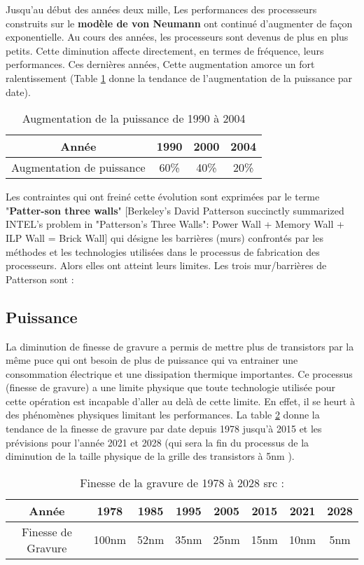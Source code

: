 Jusqu’au début des années deux mille, Les performances des processeurs construits sur le \textbf{modèle de von Neumann} ont continué d’augmenter de façon exponentielle. Au cours des années, les processeurs sont devenus de plus en plus petits. Cette diminution affecte directement, en termes de fréquence, leurs performances. Ces dernières années, Cette augmentation amorce un fort ralentissement (Table \ref{table:TB_2_1} donne la tendance de l'augmentation de la puissance par date).

\begin{table}[h!]
\centering
\begin{tabular}{| c |c | c | c|} 
\hline
Année & 1990 & 2000 & 2004 \\ [0.5ex] \hline
Augmentation de puissance & 60\% & 40\% & 20\% \\ [1ex] 
\hline
\end{tabular}
\caption{Augmentation de la puissance de 1990 à 2004 \cite{qaca17}}
\label{table:TB_2_1}
\end{table}

Les contraintes qui ont freiné cette évolution sont exprimées par le terme "\textbf{Patter-son three walls}" [Berkeley's David Patterson succinctly summarized INTEL's problem in "Patterson's Three Walls": Power Wall + Memory Wall + ILP Wall = Brick Wall]\cite{russ10} qui désigne les barrières (murs) confrontés par les méthodes et les technologies utilisées dans le processus de fabrication des processeurs. Alors elles ont atteint leurs limites. Les trois mur/barrières de Patterson sont :
%
\subsection{Puissance}
%
La diminution de finesse de gravure a permis de mettre plus de transistors par la même puce qui ont besoin de plus de puissance qui va entrainer une consommation électrique et une dissipation thermique importantes. %
Ce processus (finesse de gravure) a une limite physique que toute technologie utilisée pour cette opération est incapable d'aller au delà de cette limite. En effet, il se heurt à des phénomènes physiques limitant les performances. La table \ref{table:TB_2_2} donne la tendance de la finesse de gravure par date depuis 1978  jusqu'à 2015 et les prévisions pour l'année 2021 et 2028 (qui sera la fin du processus de la diminution de la taille physique de la grille des transistors à 5nm \cite{toms16}).

\begin{table}[h!]
\centering
\begin{tabular}{| c | c | c | c | c | c | c | c|} 
\hline
Année                  & 1978    & 1985  & 1995  & 2005  & 2015  & 2021  & 2028 \\ [0.5ex] \hline
Finesse de Gravure & 100nm & 52nm & 35nm & 25nm & 15nm & 10nm & 5nm \\ [1ex]  \hline
\end{tabular}
\caption{Finesse de la gravure de 1978 à 2028 src : \cite{toms16}} %
\label{table:TB_2_2}
\end{table}

